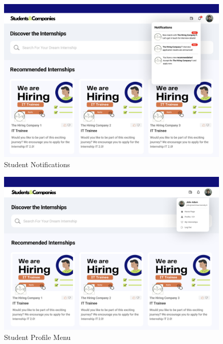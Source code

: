 \documentclass{article}
\begin{document}
\begin{figure}[H]
    \centering
    \includegraphics[scale = 0.435]{figures/UserInterfaces/Student/Notifications.png}
    \caption{Student Notifications}
     \centering
\end{figure}

\begin{figure}[H]
    \centering
    \includegraphics[scale = 0.40]{figures/UserInterfaces/Student/ProfileMenu.png}
    \caption{Student Profile Menu}
     \centering
\end{figure}
\end{document}

